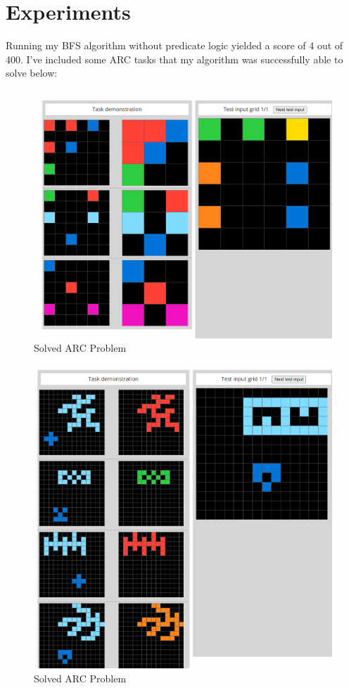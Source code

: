 \documentclass[letterpaper]{article} %
\begin{document}
\section{Experiments}
Running my BFS algorithm without predicate logic yielded a score of 4 out of 400. I've included some ARC tasks that my algorithm was successfully able to solve below:

\begin{figure}[htbp]
    \centering
    \includegraphics[width=0.8\hsize]{solved_1.png}
    \caption{Solved ARC Problem}
    \label{fig:solved_1}
\end{figure}
\begin{figure}[htbp]
    \centering
    \includegraphics[width=0.8\hsize]{solved_2.png}
    \caption{Solved ARC Problem}
    \label{fig:solved_2}
\end{figure}
\end{document}
